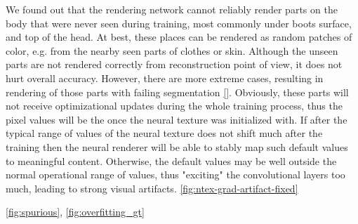 We found out that the rendering network cannot reliably render parts on the body that were never seen during training, most commonly under boots surface, and top of the head. At best, these places can be rendered as random patches of color, e.g. from the nearby seen parts of clothes or skin. Although the unseen parts are not rendered correctly from reconstruction point of view, it does not hurt overall accuracy. However, there are more extreme cases, resulting in rendering of those parts with failing segmentation \ref{}. Obviously, these parts will not receive optimizational updates during the whole training process, thus the pixel values will be the once the neural texture was initialized with. If after the typical range of values of the neural texture does not shift much after the training then the neural renderer will be able to stably map such default values to meaningful content. Otherwise, the default values may be well outside the normal operational range of values, thus "exciting" the convolutional layers too much, leading to strong visual artifacts.
\ref{fig:ntex-grad-artifact-fixed}

\ref{fig:spurious}, \ref{fig:overfitting_gt}



